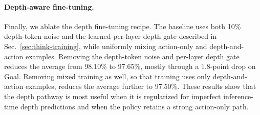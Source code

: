 \begin{table}[h]
\centering
\caption{\textbf{Ablation of \molmoactt fine-tuning design choices on
\libero.} Component columns indicate whether each design choice is enabled:
\textcolor{forestgreen}{\cmark} denotes enabled and \textcolor{darkred}{\xmark}
denotes disabled. \textbf{Bold} denotes the best result per column. The final row is the \molmoacttlib recipe, where its training design is marked in pink, which is what we stick to in all of \molmoactt fine-tuning runs.}
\label{tab:ablation-training-design}
\end{table}

\paragraph{Depth-aware fine-tuning.}
Finally, we ablate the \molmothink depth fine-tuning recipe. The baseline
uses both 10\% depth-token noise and the learned per-layer depth gate described
in Sec.~\ref{sec:think-training}, while uniformly mixing action-only and
depth-and-action examples. Removing the depth-token noise and per-layer depth
gate reduces the average from 98.10\% to 97.65\%, mostly through a 1.8-point
drop on Goal. Removing mixed training as well, so that training uses only
depth-and-action examples, reduces the average further to 97.50\%. These
results show that the depth pathway is most useful when it is regularized for
imperfect inference-time depth predictions and when the policy retains a strong
action-only path.

